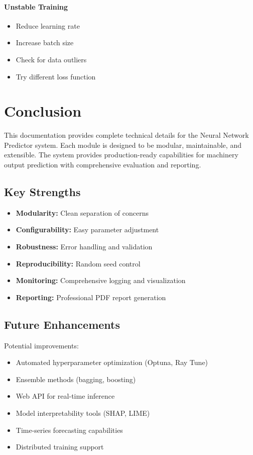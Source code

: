\documentclass[11pt,a4paper]{article}
\begin{document}
\paragraph{Unstable Training}
\begin{itemize}
    \item Reduce learning rate
    \item Increase batch size
    \item Check for data outliers
    \item Try different loss function
\end{itemize}

\section{Conclusion}

This documentation provides complete technical details for the Neural Network Predictor system. Each module is designed to be modular, maintainable, and extensible. The system provides production-ready capabilities for machinery output prediction with comprehensive evaluation and reporting.

\subsection{Key Strengths}

\begin{itemize}
    \item \textbf{Modularity:} Clean separation of concerns
    \item \textbf{Configurability:} Easy parameter adjustment
    \item \textbf{Robustness:} Error handling and validation
    \item \textbf{Reproducibility:} Random seed control
    \item \textbf{Monitoring:} Comprehensive logging and visualization
    \item \textbf{Reporting:} Professional PDF report generation
\end{itemize}

\subsection{Future Enhancements}

Potential improvements:
\begin{itemize}
    \item Automated hyperparameter optimization (Optuna, Ray Tune)
    \item Ensemble methods (bagging, boosting)
    \item Web API for real-time inference
    \item Model interpretability tools (SHAP, LIME)
    \item Time-series forecasting capabilities
    \item Distributed training support
\end{itemize}
\end{document}
